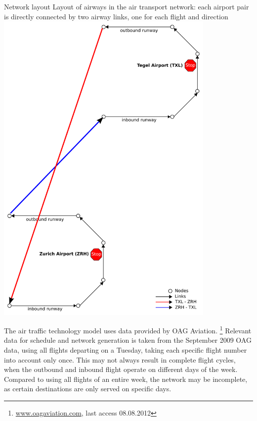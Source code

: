 {\citet{GretherFuerbasNagelFlightTechnology}}
%
%
\createfigure%
{Network layout}%
{Layout of airways in the air transport network: each airport pair is directly connected by two airway links, one for each flight and direction}%
{\label{fig:air_network_model}}
{\includegraphics[width=0.8\textwidth]{extending/figures/air/sf_airport_network_no_slide.pdf}}%
{\citet{GretherFuerbasNagelFlightTechnology}}

The air traffic technology model uses data provided by OAG  Aviation.%
\footnote{\url{www.oagaviation.com}, last access 08.08.2012}
Relevant data for schedule and network generation is taken from the September 2009 OAG  data, using all flights departing on a Tuesday, taking each specific flight number into account only once.
This may not always result in complete flight cycles, \eg when the outbound and inbound flight operate on different days of the week. 
Compared to using all flights of an entire week, the network may be incomplete, as certain destinations are only served on specific days.

